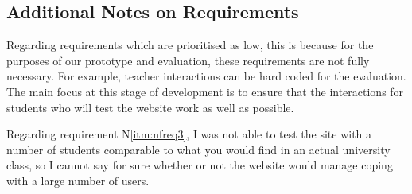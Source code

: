 \documentclass[a4paper,11pt]{report}
\begin{document}
\subsection{Additional Notes on Requirements}
Regarding requirements which are prioritised as low, this is because for the purposes of our prototype and evaluation, these requirements are not fully necessary. For example, teacher interactions can be hard coded for the evaluation. The main focus at this stage of development is to ensure that the interactions for students who will test the website work as well as possible.\par
Regarding requirement N\ref{itm:nfreq3}, I was not able to test the site with a number of students comparable to what you would find in an actual university class, so I cannot say for sure whether or not the website would manage coping with a large number of users.
\end{document}
